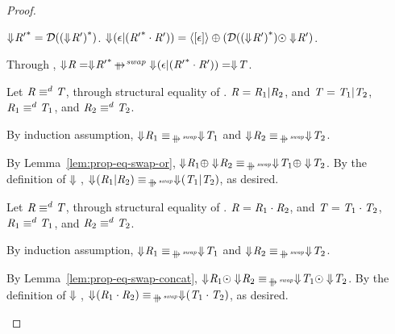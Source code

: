 \documentclass[numbers,10pt,preprint\ifanon ,nocopyrightspace\fi]{sigplanconf}
\begin{document}
\begin{proof}
\begin{case}[\UnrollstarRightRule{}]
    $\Downarrow\mkern-4mu {\mathit{R}'}^* =
    \mathcal{D}({(\Downarrow\mkern-4mu \mathit{R}')}^*)$.
    $\Downarrow\mkern-4mu (\epsilon | ({\mathit{R}'}^* \cdot \mathit{R}')) =
    \langle[\epsilon]\rangle \oplus
    (\mathcal{D}({(\Downarrow\mkern-4mu \mathit{R}')}^*) \odot
    \Downarrow\mkern-4mu \mathit{R}')$.
    
    Through \AtomUnrollstarRightRule{},
    $\ToDNFRegexOf{\Regex} =
    \ToDNFRegexOf{\StarOf{\Regex'}} \ParallelRewriteSwap
    \ToDNFRegexOf{(\EmptyString \Or (\StarOf{\Regex'} \Concat \Regex'))} =
    \ToDNFRegexOf{\RegexAlt}$.
  \end{case}

  \begin{case}
    Let $\mathit{R} \equiv^d \mathit{T}$, through structural equality of
    \OrRegexType{}.
    $\mathit{R} = \mathit{R}_1 | \mathit{R}_2$, and
    $\mathit{T} = \mathit{T}_1 | \mathit{T}_2$,
    $\mathit{R}_1 \equiv^d \mathit{T}_1$, and
    $\mathit{R}_2 \equiv^d \mathit{T}_2$.

    By induction assumption,
    $\ToDNFRegexOf{\Regex_1} \EquivalenceOf{\ParallelRewriteSwap}
    \ToDNFRegexOf{\RegexAlt_1}$ and
    $\ToDNFRegexOf{\Regex_2} \EquivalenceOf{\ParallelRewriteSwap}
    \ToDNFRegexOf{\RegexAlt_2}$.

    By Lemma~\ref{lem:prop-eq-swap-or},
    $\ToDNFRegexOf{\Regex_1} \OrDNF \ToDNFRegexOf{\Regex_2}
    \EquivalenceOf{\ParallelRewriteSwap}
    \ToDNFRegexOf{\RegexAlt_1} \OrDNF \ToDNFRegexOf{\RegexAlt_2}$.
    By the definition of $\Downarrow{}$,
    $\ToDNFRegexOf{(\Regex_1 \Or \Regex_2)}
    \EquivalenceOf{\ParallelRewriteSwap}
    \ToDNFRegexOf{(\RegexAlt_1 \Or \RegexAlt_2)}$, as desired.
  \end{case}

  \begin{case}
    Let $\mathit{R} \equiv^d \mathit{T}$, through structural equality of
    \ConcatRegexType{}.
    $\mathit{R} = \mathit{R}_1 \cdot \mathit{R}_2$, and
    $\mathit{T} = \mathit{T}_1 \cdot \mathit{T}_2$,
    $\mathit{R}_1 \equiv^d \mathit{T}_1$, and
    $\mathit{R}_2 \equiv^d \mathit{T}_2$.

    By induction assumption,
    $\ToDNFRegexOf{\Regex_1} \EquivalenceOf{\ParallelRewriteSwap}
    \ToDNFRegexOf{\RegexAlt_1}$ and
    $\ToDNFRegexOf{\Regex_2} \EquivalenceOf{\ParallelRewriteSwap}
    \ToDNFRegexOf{\RegexAlt_2}$.

    By Lemma~\ref{lem:prop-eq-swap-concat},
    $\ToDNFRegexOf{\Regex_1} \ConcatDNF \ToDNFRegexOf{\Regex_2}
    \EquivalenceOf{\ParallelRewriteSwap}
    \ToDNFRegexOf{\RegexAlt_1} \ConcatDNF \ToDNFRegexOf{\RegexAlt_2}$.
    By the definition of $\Downarrow{}$,
    $\ToDNFRegexOf{(\Regex_1 \Concat \Regex_2)}
    \EquivalenceOf{\ParallelRewriteSwap}
    \ToDNFRegexOf{(\RegexAlt_1 \Concat \RegexAlt_2)}$, as desired.
  \end{case}


\end{proof}
\end{document}
